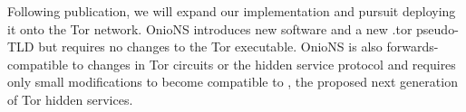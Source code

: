\documentclass[USenglish,oneside,twocolumn]{article}
\begin{document}
Following publication, we will expand our implementation and pursuit deploying it onto the Tor network. OnioNS introduces new software and a new .tor pseudo-TLD but requires no changes to the Tor executable. OnioNS is also forwards-compatible to changes in Tor circuits or the hidden service protocol and requires only small modifications to become compatible to \cite{TorProp224}, the proposed next generation of Tor hidden services.



\end{document}
